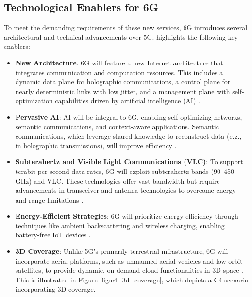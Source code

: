 \documentclass[acmtog]{acmart}
\begin{document}
\subsection{Technological Enablers for 6G}

To meet the demanding requirements of these new services, 6G introduces several architectural and technical advancements over 5G. \citet{ref4} highlights the following key enablers:

\begin{itemize}
  \item \textbf{New Architecture}: 6G will feature a new Internet architecture that integrates communication and computation resources. This includes a dynamic data plane for holographic communications, a control plane for nearly deterministic links with low jitter, and a management plane with self-optimization capabilities driven by artificial intelligence (AI) \citep{ref4}.
  \item \textbf{Pervasive AI}: AI will be integral to 6G, enabling self-optimizing networks, semantic communications, and context-aware applications. Semantic communications, which leverage shared knowledge to reconstruct data (e.g., in holographic transmissions), will improve efficiency \citep{ref4_4}.
  \item \textbf{Subterahertz and Visible Light Communications (VLC)}: To support terabit-per-second data rates, 6G will exploit subterahertz bands (90--450 GHz) and VLC. These technologies offer vast bandwidth but require advancements in transceiver and antenna technologies to overcome energy and range limitations \citep{ref4_1}.
  \item \textbf{Energy-Efficient Strategies}: 6G will prioritize energy efficiency through techniques like ambient backscattering and wireless charging, enabling battery-free IoT devices \citep{ref4_5}.
  \item \textbf{3D Coverage}: Unlike 5G's primarily terrestrial infrastructure, 6G will incorporate aerial platforms, such as unmanned aerial vehicles and low-orbit satellites, to provide dynamic, on-demand cloud functionalities in 3D space \citep{ref4}. This is illustrated in Figure \ref{fig:c4_3d_coverage}, which depicts a C4 scenario incorporating 3D coverage.
\end{itemize}
\end{document}
